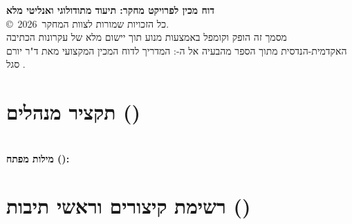\documentclass[12pt,a4paper,oneside]{book}
\begin{document}
\thispagestyle{empty}
\vspace*{\fill}
\begin{flushright}
{\small\color{BrandNavy}
\textbf{דוח מכין לפרויקט מחקר: תיעוד מתודולוגי ואנליטי מלא}\\[0.2cm]
\textenglish{\copyright\ 2026}\ כל הזכויות שמורות לצוות המחקר.\\
מסמך זה הופק וקומפל באמצעות מנוע  תוך יישום מלא של עקרונות הכתיבה האקדמית-הנדסית מתוך הספר מהבעיה אל ה-: המדריך לדוח המכין המקצועי מאת ד"ר יורם סגל \cite{segal2026prep,segal2026l03}.
}
\end{flushright}
\cleardoublepage

\chapter*{תקציר מנהלים ()}

\vspace{0.5cm}
\noindent{\color{BrandNavy}\rule{\textwidth}{0.8pt}}\\[0.15cm]
\noindent\textbf{\hebrewfontsf\color{BrandNavy} מילות מפתח ():}

\cleardoublepage

\tableofcontents
\cleardoublepage

\listoffigures
\cleardoublepage

\listoftables
\cleardoublepage

\chapter*{רשימת קיצורים וראשי תיבות ()}

\mainmatter









\backmatter
\cleardoublepage
\printbibliography
\end{document}
